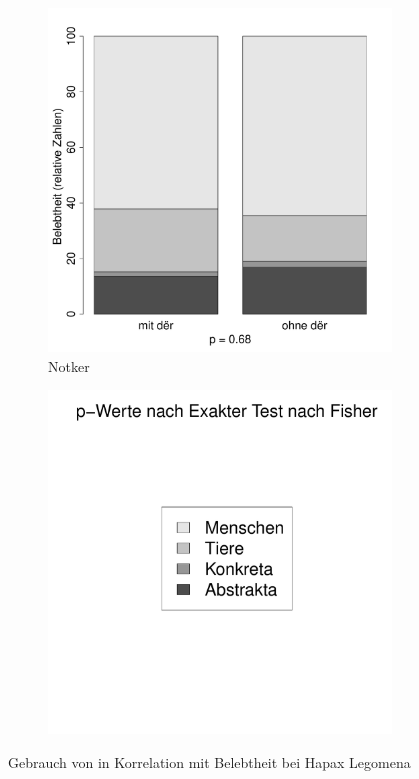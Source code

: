 \begin{figure}
\begin{subfigure}[b]{.5\linewidth}
  \includegraphics[height=.25\textheight]{generated/images/belebtheit-hapaxe-N}
\caption {Notker}
\end{subfigure}%
\begin{subfigure}[b]{.5\linewidth}
  \includegraphics[height=.25\textheight]{generated/images/belebtheit-legende}
\end{subfigure}
\caption{Gebrauch von  in Korrelation mit Belebtheit bei Hapax Legomena}\label{fig:bel-hapaxe}
\label{fig:residuals-bel-hapaxe}
\end{figure}

